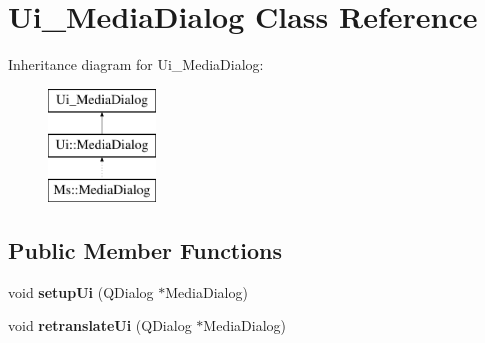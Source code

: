 \hypertarget{class_ui___media_dialog}{}\section{Ui\+\_\+\+Media\+Dialog Class Reference}
\label{class_ui___media_dialog}
Inheritance diagram for Ui\+\_\+\+Media\+Dialog\+:\begin{figure}[H]
\begin{center}
\leavevmode
\includegraphics[height=3.000000cm]{class_ui___media_dialog}
\end{center}
\end{figure}
\subsection*{Public Member Functions}
\begin{DoxyCompactItemize}
\item 
\mbox{\label{class_ui___media_dialog_af5b90241728d2a9beb65b67d60deecb7}} 
void {\bfseries setup\+Ui} (Q\+Dialog $\ast$Media\+Dialog)
\item 
\mbox{\label{class_ui___media_dialog_a962ef69d5e7a7361cfcd767630b987f8}} 
void {\bfseries retranslate\+Ui} (Q\+Dialog $\ast$Media\+Dialog)
\end{DoxyCompactItemize}
